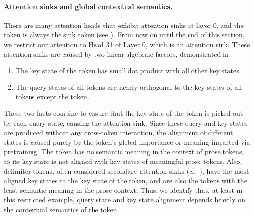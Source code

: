 \paragraph{Attention sinks and global contextual semantics.} There are many attention heads that exhibit attention sinks at layer \(0\), and the \bos{} token is always the sink token (see ). From now on until the end of this section, we restrict our attention to Head 31 of Layer 0, which is an attention sink. These attention sinks are caused by two linear-algebraic factors, demonstrated in .
\begin{enumerate}
    \item The key state of the \bos{} token has small dot product with all other key states. 
    \item The query states of all tokens are nearly orthogonal to the key states of all tokens except the \bos{} token.
\end{enumerate}
 These two facts combine to ensure that the key state of the \bos{} token is picked out by each query state, causing the attention sink. Since these query and key states are produced without any cross-token interaction, the alignment of different states is caused purely by the token's global importance or meaning imparted via pretraining. The \bos{} token has no semantic meaning in the context of prose tokens, so its key state is not aligned with key states of meaningful prose tokens. Also, delimiter tokens, often considered secondary attention sinks (cf.~), have the most aligned key states to the key state of the \bos{} token, and are also the tokens with the least semantic meaning in the prose context. Thus, we identify that, at least in this restricted example, query state and key state alignment depends heavily on the contextual semantics of the token.

